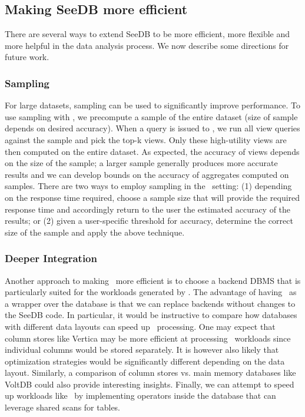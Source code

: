 \subsection{Making SeeDB more efficient} 
There are several ways to extend SeeDB to be more efficient, more
flexible and more helpful in the data analysis process. We now describe some
directions for future work.

\subsubsection {Sampling}
  For large datasets, sampling can be used to significantly improve
  performance. To use sampling with \SeeDB, we precompute a sample of the
  entire dataset (size of sample depends on desired accuracy). When a query is
  issued to \SeeDB, we run all view queries against the sample and pick the
  top-k views. Only these high-utility views are then computed on the entire
  dataset. As expected, the accuracy of views depends on the size of the sample;
  a larger sample generally produces more accurate results and we can develop
  bounds on the accuracy of aggregates computed on samples.
  There are two ways to employ sampling in the \SeeDB\ setting:
  (1) depending on the response time required, choose a sample size that will
  provide the required response time and accordingly return to the user the
  estimated accuracy of the results; or (2) given a user-specific threshold for
  accuracy, determine the correct size of the sample and apply the above
  technique. 
  

  \subsubsection{Deeper Integration}

Another approach to making \SeeDB\ more efficient is to choose a backend DBMS
that is particularly suited for the workloads generated by \SeeDB.
The advantage of having \SeeDB\ as a wrapper over
the database is that we can replace backends without changes to the SeeDB code.
In particular, it would be instructive to compare how databases with different
data layouts can speed up \SeeDB\ processing. One may expect that column stores
like Vertica may be more efficient at processing \SeeDB\ workloads since
individual columns would be stored separately. It is however also likely that
optimization strategies would be significantly different depending on
the data layout.
Similarly, a comparison of column stores vs. main memory databases like VoltDB
could also provide interesting insights.
Finally, we can attempt to speed up workloads like \SeeDB\ by implementing
operators inside the database that can leverage shared scans for tables. 

